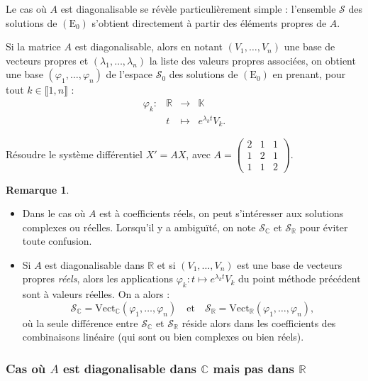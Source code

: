 \documentclass[french]{article}
\newcommand{\R}{\mathbb{R}}
\newcommand{\C}{\mathbb{C}}
\newcommand{\K}{\mathbb{K}}
\newcommand{\Vect}{\text{Vect}}
\theoremstyle{plain}
\theoremstyle{definition}
\newtheorem*{rmq}{Remarque}
\theoremstyle{remark}
\begin{document}
Le cas où $A$ est diagonalisable se révèle particulièrement simple : l'ensemble $\mathcal{S}$ des solutions de $(\text{E}_0)$ s'obtient directement à partir des éléments propres de $A$.

\begin{met}
	Si la matrice $A$ est diagonalisable, alors en notant $(V_1,\ldots,V_n)$ une base de vecteurs propres et $(\lambda_1,\ldots,\lambda_n)$ la liste des valeurs propres associées, on obtient une base $(\varphi_1,\ldots,\varphi_n)$ de l'espace $\mathcal{S}_0$ des solutions de $(\text{E}_0)$ en prenant, pour tout $k\in\llbracket1,n\rrbracket$ : $$\begin{array}{lrcl}
		\varphi_k:&\R&\longrightarrow&\K \\
		&t&\longmapsto&e^{\lambda_k t}V_k.
	\end{array}$$
\end{met}

\begin{exo}
	Résoudre le système différentiel $X'=AX$, avec $A=\begin{pmatrix}
		2&1&1\\
		1&2&1\\
		1&1&2
	\end{pmatrix}$.
\end{exo}

\begin{rmq}
	\begin{itemize}
		\item Dans le cas où $A$ est à coefficients réels, on peut s'intéresser aux solutions complexes ou réelles. Lorsqu'il y a ambiguïté, on note $\mathcal{S}_\C$ et $\mathcal{S}_\R$ pour éviter toute confusion.
		\item Si $A$ est diagonalisable dans $\R$ et si $(V_1,\ldots,V_n)$ est une base de vecteurs propres \textit{réels}, alors les applications $\varphi_k:t\mapsto e^{\lambda_k t}V_k$ du point méthode précédent sont à valeurs réelles. On a alors :
		$$\mathcal{S}_\C=\Vect_\C(\varphi_1,\ldots,\varphi_n)\quad\text{et}\quad\mathcal{S}_\R=\Vect_\R(\varphi_1,\ldots,\varphi_n),$$ où la seule différence entre $\mathcal{S}_\C$ et $\mathcal{S}_\R$ réside alors dans les coefficients des combinaisons linéaire (qui sont ou bien complexes ou bien réels).
	\end{itemize}
\end{rmq}

\subsubsection*{Cas où $A$ est diagonalisable dans $\C$ mais pas dans $\R$}
\end{document}
